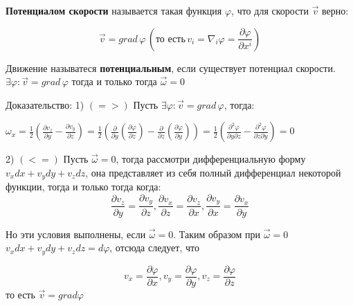  \textbf{Потенциалом скорости} называется такая функция $\varphi$, что для скорости $\vec{v}$ верно:

$$
\vec{v} = grad\, \varphi\, (\text{то есть}\, v_i = \nabla_i \varphi = \frac{\partial \varphi}{\partial x^i})
$$

 Движение называтеся \textbf{потенциальным}, если существует потенциал скорости.
\state $\exists \varphi : \vec{v} = grad\, \varphi$ тогда и только тогда $\vec{\omega} = 0$

Доказательство:
1) $(=>)$ Пусть $\exists \varphi : \vec{v} = grad \, \varphi$, тогда:

$
\omega_x = \frac{1}{2}(\frac{\partial v_z}{\partial y} - \frac{\partial v_y}{\partial z}) = \frac{1}{2}(\frac{\partial}{\partial y}(\frac{\partial \varphi}{\partial z}) - \frac{\partial}{\partial z}(\frac{\partial \varphi}{\partial y})) = \frac{1}{2} (\frac{\partial^2 \varphi}{\partial y \partial z} - \frac{\partial^2 \varphi}{\partial z \partial y}) = 0
$ 

2) $(<=)$ Пусть $\vec{\omega} = 0$, тогда рассмотри дифференциальную форму $v_xdx + v_ydy + v_zdz$, она представляет из себя полный дифференциал некоторой функции, тогда и только тогда когда:
$$
\frac{\partial v_z}{\partial y} = \frac{\partial v_y}{\partial z}, \frac{\partial v_x}{\partial z} = \frac{\partial v_z}{\partial x}, \frac{\partial v_y}{\partial x} = \frac{\partial v_x}{\partial y} 
$$

Но эти условия выполнены, если $\vec{\omega} = 0$. Таким образом при $\vec{\omega} = 0$
$v_xdx + v_ydy + v_zdz = d\varphi$, отсюда следует, что 

$$
v_x = \frac{\partial \varphi} {\partial x}, v_y = \frac{\partial \varphi} {\partial y}, v_z = \frac{\partial \varphi} {\partial z}
$$ то есть $\vec{v} = grad\varphi$